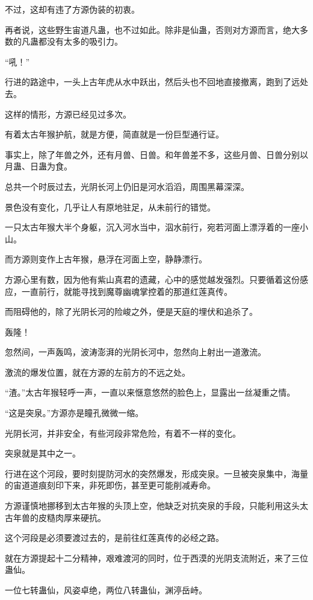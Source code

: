 \begin{this_body}
不过，这却有违了方源伪装的初衷。

再者说，这些野生宙道凡蛊，也不过如此。除非是仙蛊，否则对方源而言，绝大多数的凡蛊都没有太多的吸引力。

“吼！”

行进的路途中，一头上古年虎从水中跃出，然后头也不回地直接撤离，跑到了远处去。

这样的情形，方源已经见过多次。

有着太古年猴护航，就是方便，简直就是一份巨型通行证。

事实上，除了年兽之外，还有月兽、日兽。和年兽差不多，这些月兽、日兽分别以月蛊、日蛊为食。

总共一个时辰过去，光阴长河上仍旧是河水滔滔，周围黑幕深深。

景色没有变化，几乎让人有原地驻足，从未前行的错觉。

一只太古年猴大半个身躯，沉入河水当中，泅水前行，宛若河面上漂浮着的一座小山。

而方源则变作上古年猴，悬浮在河面上空，静静漂行。

方源心里有数，因为他有紫山真君的遗藏，心中的感觉越发强烈。只要循着这份感应，一直前行，就能寻找到魔尊幽魂掌控着的那道红莲真传。

而阻碍他的，除了光阴长河的险峻之外，便是天庭的埋伏和追杀了。

轰隆！

忽然间，一声轰鸣，波涛澎湃的光阴长河中，忽然向上射出一道激流。

激流的爆发位置，就在方源的左前方的不远之处。

“渣。”太古年猴轻呼一声，一直以来惬意悠然的脸色上，显露出一丝凝重之情。

“这是突泉。”方源亦是瞳孔微微一缩。

光阴长河，并非安全，有些河段非常危险，有着不一样的变化。

突泉就是其中之一。

行进在这个河段，要时刻提防河水的突然爆发，形成突泉。一旦被突泉集中，海量的宙道道痕刻印下来，非死即伤，甚至更可能削减寿命。

方源谨慎地挪移到太古年猴的头顶上空，他缺乏对抗突泉的手段，只能利用这头太古年兽的皮糙肉厚来硬抗。

这个河段是必须要渡过去的，是前往红莲真传的必经之路。

就在方源提起十二分精神，艰难渡河的同时，位于西漠的光阴支流附近，来了三位蛊仙。

一位七转蛊仙，风姿卓绝，两位八转蛊仙，渊渟岳峙。


\end{this_body}

